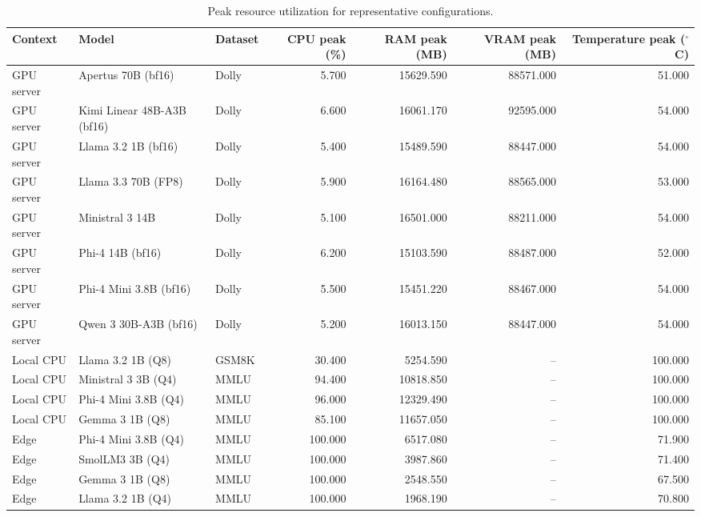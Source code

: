 \begin{table}[t]
\centering
\caption{Peak resource utilization for representative configurations.}
\label{tab:peak-resources}
\scriptsize
\setlength{\tabcolsep}{3.2pt}
\renewcommand{\arraystretch}{1.08}
\begin{tabularx}{\textwidth}{@{}lLLrrrr@{}}
\toprule
\textbf{Context} & \textbf{Model} & \textbf{Dataset} & \textbf{CPU peak (\%)} & \textbf{RAM peak (MB)} & \textbf{VRAM peak (MB)} & \textbf{Temperature peak ($^\circ$C)} \\
\midrule
GPU server & Apertus 70B (bf16) & Dolly & 5.700 & 15629.590 & 88571.000 & 51.000 \\
GPU server & Kimi Linear 48B-A3B (bf16) & Dolly & 6.600 & 16061.170 & 92595.000 & 54.000 \\
GPU server & Llama 3.2 1B (bf16) & Dolly & 5.400 & 15489.590 & 88447.000 & 54.000 \\
GPU server & Llama 3.3 70B (FP8) & Dolly & 5.900 & 16164.480 & 88565.000 & 53.000 \\
GPU server & Ministral 3 14B & Dolly & 5.100 & 16501.000 & 88211.000 & 54.000 \\
GPU server & Phi-4 14B (bf16) & Dolly & 6.200 & 15103.590 & 88487.000 & 52.000 \\
GPU server & Phi-4 Mini 3.8B (bf16) & Dolly & 5.500 & 15451.220 & 88467.000 & 54.000 \\
GPU server & Qwen 3 30B-A3B (bf16) & Dolly & 5.200 & 16013.150 & 88447.000 & 54.000 \\
Local CPU & Llama 3.2 1B (Q8) & GSM8K & 30.400 & 5254.590 & -- & 100.000 \\
Local CPU & Ministral 3 3B (Q4) & MMLU & 94.400 & 10818.850 & -- & 100.000 \\
Local CPU & Phi-4 Mini 3.8B (Q4) & MMLU & 96.000 & 12329.490 & -- & 100.000 \\
Local CPU & Gemma 3 1B (Q8) & MMLU & 85.100 & 11657.050 & -- & 100.000 \\
Edge & Phi-4 Mini 3.8B (Q4) & MMLU & 100.000 & 6517.080 & -- & 71.900 \\
Edge & SmolLM3 3B (Q4) & MMLU & 100.000 & 3987.860 & -- & 71.400 \\
Edge & Gemma 3 1B (Q8) & MMLU & 100.000 & 2548.550 & -- & 67.500 \\
Edge & Llama 3.2 1B (Q4) & MMLU & 100.000 & 1968.190 & -- & 70.800 \\
\bottomrule
\end{tabularx}
\end{table}
